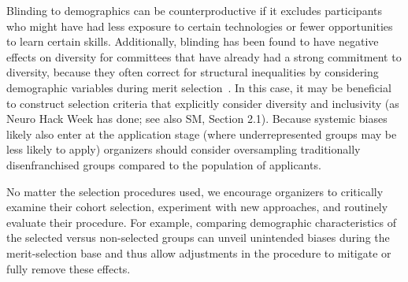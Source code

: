 Blinding to demographics can be counterproductive if it excludes participants who might have had less exposure to certain technologies or fewer opportunities to learn certain skills. Additionally, blinding has been found to have negative effects on diversity for committees that have already had a strong commitment to diversity, because they often correct for structural inequalities by considering demographic variables during merit selection~\cite{behaghel2015unintended}.
In this case, it may be beneficial to construct selection criteria that explicitly consider diversity and inclusivity (as Neuro Hack Week has done; see also SM, Section 2.1). 
Because systemic biases likely also enter at the application stage (where underrepresented groups may be less likely to apply) organizers should consider oversampling traditionally disenfranchised groups compared to the population of applicants. 

No matter the selection procedures used, we encourage organizers to critically examine their cohort selection, experiment with new approaches, and routinely evaluate their procedure. For example, comparing demographic characteristics of the selected versus non-selected groups can unveil unintended biases during the merit-selection base and thus allow adjustments in the procedure to mitigate or fully remove these effects.
